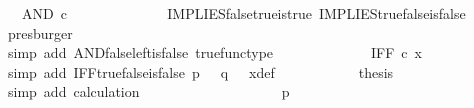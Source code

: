 \begin{isabellebody}
\ {\isachardoublequoteopen}{\isachardot}{\kern0pt}{\isachardot}{\kern0pt}{\isachardot}{\kern0pt}\ {\isacharequal}{\kern0pt}\ AND\ {\isasymcirc}\isactrlsub c\ {\isasymlangle}{\isasymf}{\isacharcomma}{\kern0pt}\ {\isasymt}{\isasymrangle}{\isachardoublequoteclose}\isanewline
\ \ \ \ \ \ \ \ \ \ \isamarkupfalse%
\ IMPLIES{\isacharunderscore}{\kern0pt}false{\isacharunderscore}{\kern0pt}true{\isacharunderscore}{\kern0pt}is{\isacharunderscore}{\kern0pt}true\ IMPLIES{\isacharunderscore}{\kern0pt}true{\isacharunderscore}{\kern0pt}false{\isacharunderscore}{\kern0pt}is{\isacharunderscore}{\kern0pt}false\ \isamarkupfalse%
\ presburger\isanewline
\ \ \ \ \ \ \ \ \isamarkupfalse%
\ \isamarkupfalse%
\ {\isachardoublequoteopen}{\isachardot}{\kern0pt}{\isachardot}{\kern0pt}{\isachardot}{\kern0pt}\ {\isacharequal}{\kern0pt}\ {\isasymf}{\isachardoublequoteclose}\isanewline
\ \ \ \ \ \ \ \ \ \ \isamarkupfalse%
\ {\isacharparenleft}{\kern0pt}simp\ add{\isacharcolon}{\kern0pt}\ AND{\isacharunderscore}{\kern0pt}false{\isacharunderscore}{\kern0pt}left{\isacharunderscore}{\kern0pt}is{\isacharunderscore}{\kern0pt}false\ true{\isacharunderscore}{\kern0pt}func{\isacharunderscore}{\kern0pt}type{\isacharparenright}{\kern0pt}\isanewline
\ \ \ \ \ \ \ \ \isamarkupfalse%
\ \isamarkupfalse%
\ {\isachardoublequoteopen}{\isachardot}{\kern0pt}{\isachardot}{\kern0pt}{\isachardot}{\kern0pt}\ {\isacharequal}{\kern0pt}\ IFF\ {\isasymcirc}\isactrlsub c\ x{\isachardoublequoteclose}\isanewline
\ \ \ \ \ \ \ \ \ \ \isamarkupfalse%
\ {\isacharparenleft}{\kern0pt}simp\ add{\isacharcolon}{\kern0pt}\ IFF{\isacharunderscore}{\kern0pt}true{\isacharunderscore}{\kern0pt}false{\isacharunderscore}{\kern0pt}is{\isacharunderscore}{\kern0pt}false\ {\isacartoucheopen}p\ {\isacharequal}{\kern0pt}\ {\isasymt}{\isacartoucheclose}\ {\isacartoucheopen}q\ {\isacharequal}{\kern0pt}\ {\isasymf}{\isacartoucheclose}\ x{\isacharunderscore}{\kern0pt}def{\isacharparenright}{\kern0pt}\isanewline
\ \ \ \ \ \ \ \ \isamarkupfalse%
\ \isamarkupfalse%
\ {\isacharquery}{\kern0pt}thesis\isanewline
\ \ \ \ \ \ \ \ \ \ \isamarkupfalse%
\ {\isacharparenleft}{\kern0pt}simp\ add{\isacharcolon}{\kern0pt}\ calculation{\isacharparenright}{\kern0pt}\isanewline
\ \ \ \ \ \ \isamarkupfalse%
\isanewline
\ \ \ \ \isamarkupfalse%
\isanewline
\ \ \isamarkupfalse%
\isanewline
\ \ \ \ \isamarkupfalse%
\ {\isachardoublequoteopen}p\ {\isasymnoteq}\ {\isasymt}{\isachardoublequoteclose}\isanewline

\end{isabellebody}
